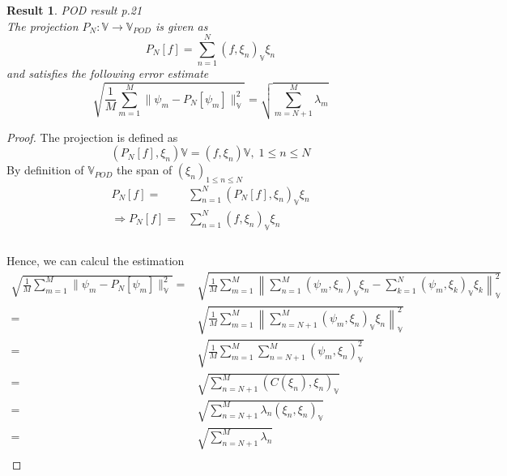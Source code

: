 \documentclass{article}
\newtheorem{result}{Result}
\begin{document}
\begin{result}{POD result p.21}
\\
The projection $P_N : \mathbb{V} \rightarrow \mathbb{V} _{POD}$ is given as
$$ P_N[f] = \sum_{n=1}^N (f,\xi _n)_\mathbb{V} \xi _n $$
and satisfies the following error estimate
$$ \sqrt{ \frac{1}{M} \sum_{m=1}^M \|\psi_m -P_N[\psi_m]\|_\mathbb{V}^2} = \sqrt{\sum_{m=N+1}^M\lambda_m} $$
\end{result}

\begin{proof}
The projection is defined as\\
$$(P_N[f],\xi_n)\mathbb{V} = (f,\xi_n)\mathbb{V},\; 1\leq n\leq N$$
By definition of $\mathbb{V}_{POD}$ the span of $(\xi_n)_{1\leq n\leq N}$\\
\begin{align*}
P_N[f] =& \sum_{n=1}^N (P_N[f],\xi_n)_\mathbb{V}\xi_n\\
\Rightarrow P_N[f] =& \sum_{n=1}^N (f,\xi_n)_\mathbb{V}\xi_n\\
\end{align*}
\\
Hence, we can calcul the estimation
\begin{align*}
\sqrt{ \frac{1}{M} \sum_{m=1}^M \|\psi_m -P_N[\psi_m]\|_\mathbb{V}^2} =& \sqrt{ \frac{1}{M} \sum_{m=1}^M \left\| \sum_{n=1}^M(\psi_m,\xi_n)_\mathbb{V} \xi_n- \sum_{k=1}^N (\psi_m,\xi_k)_\mathbb{V}\xi_k \right\| _\mathbb{V}^2}\\
=& \sqrt{ \frac{1}{M} \sum_{m=1}^M \left\| \sum_{n=N+1}^M(\psi_m,\xi_n)_\mathbb{V} \xi_n \right\| _\mathbb{V}^2 }\\
=& \sqrt{ \frac{1}{M} \sum_{m=1}^M \sum_{n=N+1}^M(\psi_m,\xi_n)_\mathbb{V}^2}\\
=& \sqrt{ \sum_{n=N+1}^M(C(\xi_n),\xi_n)_\mathbb{V}}\\
=& \sqrt{ \sum_{n=N+1}^M\lambda_n(\xi_n,\xi_n)_\mathbb{V}}\\
=& \sqrt{ \sum_{n=N+1}^M\lambda_n}\\
\end{align*}
\end{proof}




\end{document}

